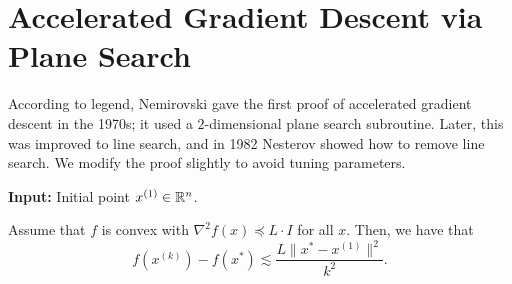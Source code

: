 
\section{Accelerated Gradient Descent via Plane Search}

According to legend, Nemirovski gave the first proof of accelerated
gradient descent in the 1970s; it used a $2$-dimensional plane search
subroutine. Later, this was improved to line search, and in 1982 Nesterov
showed how to remove line search. We modify the proof slightly to
avoid tuning parameters.

\begin{algorithm2e}[H]

\caption{$\mathtt{NemAGD}$}

\SetAlgoLined

\textbf{Input:} Initial point $x^{(1)}\in\mathbb{R}^{n}$.


\end{algorithm2e}
\begin{thm}
Assume that $f$ is convex with $\nabla^{2}f(x)\preceq L\cdot I$
for all $x$. Then, we have that 
\[
f(x^{(k)})-f(x^{*})\lesssim\frac{L\|x^{*}-x^{(1)}\|^{2}}{k^{2}}.
\]
\end{thm}


